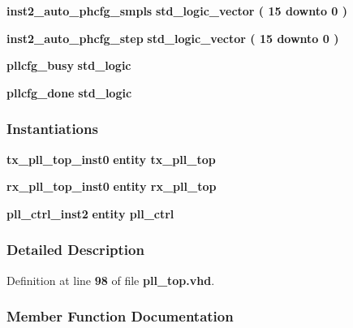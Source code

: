 \begin{DoxyCompactItemize}
\item 
{\bf inst2\+\_\+auto\+\_\+phcfg\+\_\+smpls} {\bfseries \textcolor{comment}{std\+\_\+logic\+\_\+vector}\textcolor{vhdlchar}{ }\textcolor{vhdlchar}{(}\textcolor{vhdlchar}{ }\textcolor{vhdlchar}{ } \textcolor{vhdldigit}{15} \textcolor{vhdlchar}{ }\textcolor{keywordflow}{downto}\textcolor{vhdlchar}{ }\textcolor{vhdlchar}{ } \textcolor{vhdldigit}{0} \textcolor{vhdlchar}{ }\textcolor{vhdlchar}{)}\textcolor{vhdlchar}{ }} 
\item 
{\bf inst2\+\_\+auto\+\_\+phcfg\+\_\+step} {\bfseries \textcolor{comment}{std\+\_\+logic\+\_\+vector}\textcolor{vhdlchar}{ }\textcolor{vhdlchar}{(}\textcolor{vhdlchar}{ }\textcolor{vhdlchar}{ } \textcolor{vhdldigit}{15} \textcolor{vhdlchar}{ }\textcolor{keywordflow}{downto}\textcolor{vhdlchar}{ }\textcolor{vhdlchar}{ } \textcolor{vhdldigit}{0} \textcolor{vhdlchar}{ }\textcolor{vhdlchar}{)}\textcolor{vhdlchar}{ }} 
\item 
{\bf pllcfg\+\_\+busy} {\bfseries \textcolor{comment}{std\+\_\+logic}\textcolor{vhdlchar}{ }} 
\item 
{\bf pllcfg\+\_\+done} {\bfseries \textcolor{comment}{std\+\_\+logic}\textcolor{vhdlchar}{ }} 
\end{DoxyCompactItemize}
\subsubsection*{Instantiations}
 \begin{DoxyCompactItemize}
\item 
{\bf tx\+\_\+pll\+\_\+top\+\_\+inst0}  {\bfseries entity tx\+\_\+pll\+\_\+top}   
\item 
{\bf rx\+\_\+pll\+\_\+top\+\_\+inst0}  {\bfseries entity rx\+\_\+pll\+\_\+top}   
\item 
{\bf pll\+\_\+ctrl\+\_\+inst2}  {\bfseries entity pll\+\_\+ctrl}   
\end{DoxyCompactItemize}


\subsubsection{Detailed Description}


Definition at line {\bf 98} of file {\bf pll\+\_\+top.\+vhd}.



\subsubsection{Member Function Documentation}
